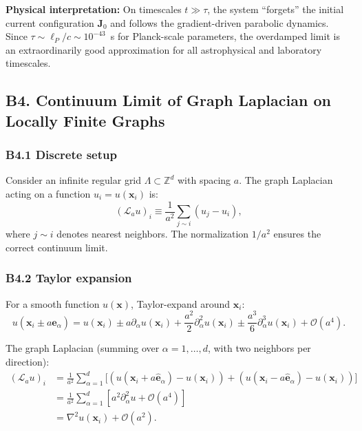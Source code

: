\documentclass[reprint]{revtex4-2}
\begin{document}
\textbf{Physical interpretation:} On timescales $t \gg \tau$, the system ``forgets'' the initial current configuration $\mathbf{J}_0$ and follows the gradient-driven parabolic dynamics. Since $\tau \sim \ell_P/c \sim 10^{-43}$~s for Planck-scale parameters, the overdamped limit is an extraordinarily good approximation for all astrophysical and laboratory timescales.

\subsection{B4. Continuum Limit of Graph Laplacian on Locally Finite Graphs}

\subsubsection{B4.1 Discrete setup}

Consider an infinite regular grid $\Lambda \subset \mathbb{Z}^d$ with spacing $a$. The graph Laplacian acting on a function $u_i = u(\mathbf{x}_i)$ is:
\begin{equation}
(\mathcal{L}_a u)_i \equiv \frac{1}{a^2}\sum_{j \sim i} (u_j - u_i),
\end{equation}
where $j\sim i$ denotes nearest neighbors. The normalization $1/a^2$ ensures the correct continuum limit.

\subsubsection{B4.2 Taylor expansion}

For a smooth function $u(\mathbf{x})$, Taylor-expand around $\mathbf{x}_i$:
\begin{equation}
u(\mathbf{x}_i \pm a\hat{\mathbf{e}}_\alpha) = u(\mathbf{x}_i) \pm a\partial_\alpha u(\mathbf{x}_i) + \frac{a^2}{2}\partial_\alpha^2 u(\mathbf{x}_i) \pm \frac{a^3}{6}\partial_\alpha^3 u(\mathbf{x}_i) + \mathcal{O}(a^4).
\end{equation}

The graph Laplacian (summing over $\alpha = 1,\ldots,d$, with two neighbors per direction):
\begin{align}
(\mathcal{L}_a u)_i &= \frac{1}{a^2}\sum_{\alpha=1}^d \Big[(u(\mathbf{x}_i + a\hat{\mathbf{e}}_\alpha) - u(\mathbf{x}_i)) + (u(\mathbf{x}_i - a\hat{\mathbf{e}}_\alpha) - u(\mathbf{x}_i))\Big]\\
&= \frac{1}{a^2}\sum_{\alpha=1}^d \left[a^2\partial_\alpha^2 u + \mathcal{O}(a^4)\right]\\
&= \nabla^2 u(\mathbf{x}_i) + \mathcal{O}(a^2).
\label{eq:graph_laplacian_limit}
\end{align}
\end{document}

